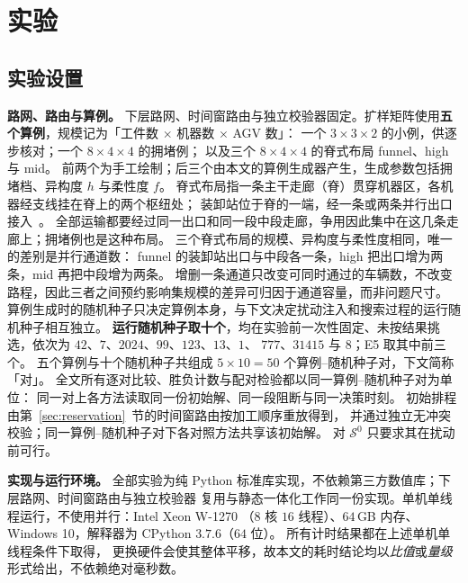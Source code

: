 \documentclass[manuscript,screen,review]{acmart}
\newcommand{\NInst}{5}
\newcommand{\NSeeds}{10}
\newcommand{\NPairs}{50}
\begin{document}
\section{实验}
\label{sec:experiments}

\subsection{实验设置}
\label{sec:protocol}

\textbf{路网、路由与算例。}
下层路网、时间窗路由与独立校验器固定。扩样矩阵使用\textbf{五个算例}，规模记为「工件数 \(\times\) 机器数 \(\times\) AGV 数」：
一个 \(3\times3\times2\) 的小例，供逐步核对；一个 \(8\times4\times4\) 的拥堵例；
以及三个 \(8\times4\times4\) 的脊式布局 funnel、high 与 mid。
前两个为手工绘制；后三个由本文的算例生成器产生，生成参数包括拥堵档、异构度 \(h\) 与柔性度 \(f\)。
脊式布局指一条主干走廊（脊）贯穿机器区，各机器经支线挂在脊上的两个枢纽处；
装卸站位于脊的一端，经一条或两条并行出口接入~\cite{suh2022spine}。
全部运输都要经过同一出口和同一段中段走廊，争用因此集中在这几条走廊上；拥堵例也是这种布局。
三个脊式布局的规模、异构度与柔性度相同，唯一的差别是并行通道数：
funnel 的装卸站出口与中段各一条，high 把出口增为两条，mid 再把中段增为两条。
增删一条通道只改变可同时通过的车辆数，不改变路程，因此三者之间预约影响集规模的差异可归因于通道容量，而非问题尺寸。
算例生成时的随机种子只决定算例本身，与下文决定扰动注入和搜索过程的运行随机种子相互独立。
\textbf{运行随机种子取十个}，均在实验前一次性固定、未按结果挑选，依次为 \(42\)、\(7\)、\(2024\)、\(99\)、\(123\)、\(13\)、\(1\)、
\(777\)、\(31415\) 与 \(8\)；E5 取其中前三个。
五个算例与十个随机种子共组成 \(\NInst\times\NSeeds=\NPairs\) 个算例--随机种子对，下文简称「对」。
全文所有逐对比较、胜负计数与配对检验都以同一算例--随机种子对为单位：
同一对上各方法读取同一份初始解、同一段阻断与同一决策时刻。
初始排程由第~\ref{sec:reservation}~节的时间窗路由按加工顺序重放得到，
并通过独立无冲突校验；同一算例--随机种子对下各对照方法共享该初始解。
对 \(\mathcal{S}^0\) 只要求其在扰动前可行。

\textbf{实现与运行环境。}
全部实验为纯 Python 标准库实现，不依赖第三方数值库；下层路网、时间窗路由与独立校验器
复用与静态一体化工作同一份实现。单机单线程运行，不使用并行：Intel Xeon W-1270
（\(8\) 核 \(16\) 线程）、\(64\)\,GB 内存、Windows 10，解释器为 CPython \(3.7.6\)（\(64\) 位）。
所有计时结果都在上述单机单线程条件下取得，
更换硬件会使其整体平移，故本文的耗时结论均以\emph{比值}或\emph{量级}形式给出，不依赖绝对毫秒数。
\end{document}
